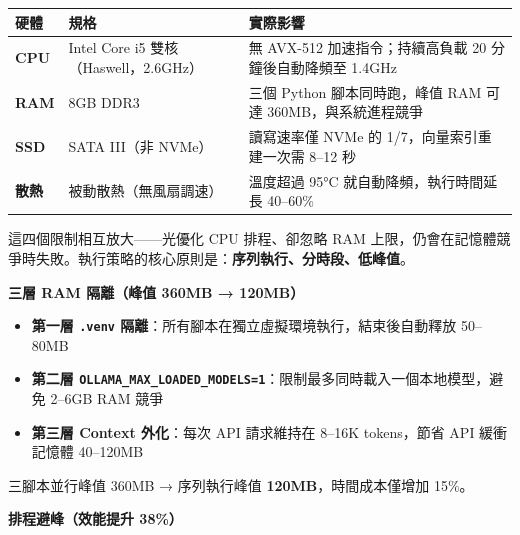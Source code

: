 {\def\LTcaptype{none} %
\begin{longtable}[]{@{}
  >{\raggedright\arraybackslash}p{}
  >{\raggedright\arraybackslash}p{}
  >{\raggedright\arraybackslash}p{}@{}}
\toprule\noalign{}
\begin{minipage}[b]{\linewidth}\raggedright
硬體
\end{minipage} & \begin{minipage}[b]{\linewidth}\raggedright
規格
\end{minipage} & \begin{minipage}[b]{\linewidth}\raggedright
實際影響
\end{minipage} \\
\midrule\noalign{}
\endhead
\bottomrule\noalign{}
\endlastfoot
\textbf{CPU} & Intel Core i5 雙核（Haswell，2.6GHz） & 無 AVX-512
加速指令；持續高負載 20 分鐘後自動降頻至 1.4GHz \\
\textbf{RAM} & 8GB DDR3 & 三個 Python 腳本同時跑，峰值 RAM 可達
360MB，與系統進程競爭 \\
\textbf{SSD} & SATA III（非 NVMe） & 讀寫速率僅 NVMe 的
1/7，向量索引重建一次需 8--12 秒 \\
\textbf{散熱} & 被動散熱（無風扇調速） & 溫度超過 95°C
就自動降頻，執行時間延長 40--60\% \\
\end{longtable}
}

這四個限制相互放大------光優化 CPU 排程、卻忽略 RAM
上限，仍會在記憶體競爭時失敗。執行策略的核心原則是：\textbf{序列執行、分時段、低峰值}。

\textbf{三層 RAM 隔離（峰值 360MB → 120MB）}

\begin{itemize}
\tightlist
\item
  \textbf{第一層 \texttt{.venv}
  隔離}：所有腳本在獨立虛擬環境執行，結束後自動釋放 50--80MB
\item
  \textbf{第二層
  \texttt{OLLAMA\_MAX\_LOADED\_MODELS=1}}：限制最多同時載入一個本地模型，避免
  2--6GB RAM 競爭
\item
  \textbf{第三層 Context 外化}：每次 API 請求維持在 8--16K tokens，節省
  API 緩衝記憶體 40--120MB
\end{itemize}

三腳本並行峰值 360MB → 序列執行峰值 \textbf{120MB}，時間成本僅增加
15\%。

\textbf{排程避峰（效能提升 38\%）}

